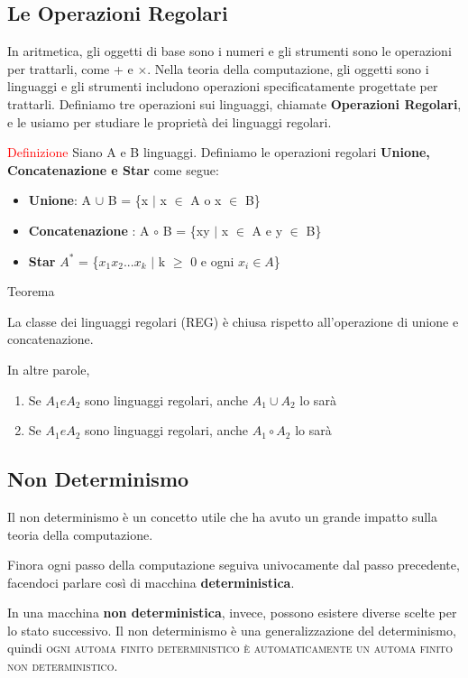 \documentclass{article}
\begin{document}
\subsection{Le Operazioni Regolari}
In aritmetica, gli oggetti di base sono i numeri e gli strumenti sono le
operazioni per trattarli, come + e $\times$. Nella teoria della computazione,
gli oggetti sono i linguaggi e gli strumenti includono operazioni
specificatamente progettate per trattarli. Definiamo tre operazioni sui
linguaggi, chiamate \textbf{Operazioni Regolari}, e le usiamo per studiare le
proprietà dei linguaggi regolari.

\textcolor{red}{Definizione}
Siano A e B linguaggi. Definiamo le operazioni regolari \textbf{Unione,
Concatenazione e Star} come segue:
\begin{itemize}
    \item \textbf{Unione}: A $\cup$ B = \{x $\mid$ x $\in$ A o x $\in$ B\}
    \item \textbf{Concatenazione} : A $\circ$ B = \{xy $\mid$ x $\in$ A e y
    $\in$ B\}
    \item \textbf{Star} $A^*$ = \{$x_1x_2...x_k$ $\mid$ k $\geq$ 0 e ogni $x_i
    \in A$\}
\end{itemize}

\textcolor{green! 50! black}{Teorema}

La classe dei linguaggi regolari (REG) è chiusa rispetto all'operazione di
unione e concatenazione.

In altre parole,
\begin{enumerate}
    \item Se $A_1 e A_2$ sono linguaggi regolari, anche $A_1 \cup A_2$ lo sarà
    \item Se $A_1 e A_2$ sono linguaggi regolari, anche $A_1 \circ A_2$ lo sarà
\end{enumerate}

\subsection{Non Determinismo}

Il non determinismo è un concetto utile che ha avuto un grande impatto sulla
teoria della computazione.

Finora ogni passo della computazione seguiva univocamente dal passo precedente,
facendoci parlare così di macchina \textbf{deterministica}.

In una macchina \textbf{non deterministica}, invece, possono esistere diverse
scelte per lo stato successivo. Il non determinismo è una generalizzazione del
determinismo, quindi \textsc{ogni automa finito deterministico è automaticamente
un automa finito non deterministico}.
\end{document}
